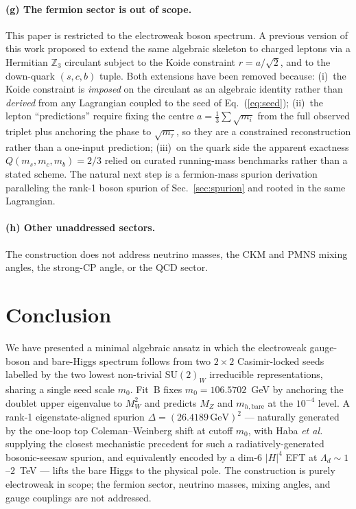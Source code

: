 \documentclass[%
 aps,
 prd,
 reprint,
 nofootinbib,
 superscriptaddress,
 amsmath,
 amssymb,
]{revtex4-2}
\begin{document}
\paragraph{(g) The fermion sector is out of scope.} This paper is restricted to the electroweak boson spectrum. A previous version of this work proposed to extend the same algebraic skeleton to charged leptons via a Hermitian $\mathbb{Z}_3$ circulant subject to the Koide constraint $r=a/\sqrt{2}$, and to the down-quark $(s,c,b)$ tuple. Both extensions have been removed because: (i)~the Koide constraint is \emph{imposed} on the circulant as an algebraic identity rather than \emph{derived} from any Lagrangian coupled to the seed of Eq.~(\ref{eq:seed}); (ii)~the lepton ``predictions'' require fixing the centre $a=\tfrac{1}{3}\sum\sqrt{m_i}$ from the full observed triplet plus anchoring the phase to $\sqrt{m_\tau}$, so they are a constrained reconstruction rather than a one-input prediction; (iii)~on the quark side the apparent exactness $Q(m_s,m_c,m_b)=2/3$ relied on curated running-mass benchmarks rather than a stated scheme. The natural next step is a fermion-mass spurion derivation paralleling the rank-1 boson spurion of Sec.~\ref{sec:spurion} and rooted in the same Lagrangian.

\paragraph{(h) Other unaddressed sectors.} The construction does not address neutrino masses, the CKM and PMNS mixing angles, the strong-CP angle, or the QCD sector.

\section{Conclusion}\label{sec:conclusion}

We have presented a minimal algebraic ansatz in which the electroweak gauge-boson and bare-Higgs spectrum follows from two $2\times 2$ Casimir-locked seeds labelled by the two lowest non-trivial $\mathrm{SU}(2)_W$ irreducible representations, sharing a single seed scale $m_0$. Fit~B fixes $m_0=106.5702$~GeV by anchoring the doublet upper eigenvalue to $M_W^2$ and predicts $M_Z$ and $m_{h,\mathrm{bare}}$ at the $10^{-4}$ level. A rank-1 eigenstate-aligned spurion $\Delta=(26.4189\,\mathrm{GeV})^2$ --- naturally generated by the one-loop top Coleman--Weinberg shift at cutoff $m_0$, with Haba \emph{et al.}~\cite{Haba2016} supplying the closest mechanistic precedent for such a radiatively-generated bosonic-seesaw spurion, and equivalently encoded by a dim-6 $|H|^4$ EFT at $\Lambda_d\sim 1$--$2$~TeV --- lifts the bare Higgs to the physical pole. The construction is purely electroweak in scope; the fermion sector, neutrino masses, mixing angles, and gauge couplings are not addressed.
\end{document}
